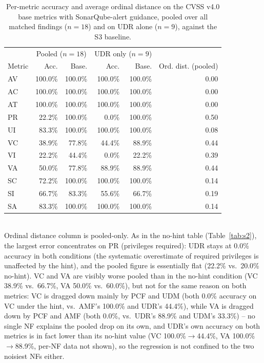 \begin{table}[t]
\centering
\caption{Per-metric accuracy and average ordinal distance on the CVSS v4.0 base metrics with SonarQube-alert guidance, pooled over all matched findings ($n=18$) and on UDR alone ($n=9$), against the S3 baseline.}
\label{tab:s2-hint}
\begin{tabular}{lrrrrr}
\toprule
& \multicolumn{2}{c}{Pooled ($n=18$)} & \multicolumn{2}{c}{UDR only ($n=9$)} & \\
Metric & Acc. & Base. & Acc. & Base. & Ord. dist. (pooled) \\
\midrule
AV & 100.0\% & 100.0\% & 100.0\% & 100.0\% & 0.00 \\
AC & 100.0\% & 100.0\% & 100.0\% & 100.0\% & 0.00 \\
AT & 100.0\% & 100.0\% & 100.0\% & 100.0\% & 0.00 \\
PR & 22.2\%  & 100.0\% & 0.0\%   & 100.0\% & 0.50 \\
UI & 83.3\%  & 100.0\% & 100.0\% & 100.0\% & 0.08 \\
VC & 38.9\%  & 77.8\%  & 44.4\%  & 88.9\%  & 0.44 \\
VI & 22.2\%  & 44.4\%  & 0.0\%   & 22.2\%  & 0.39 \\
VA & 50.0\%  & 77.8\%  & 88.9\%  & 88.9\%  & 0.44 \\
SC & 72.2\%  & 100.0\% & 100.0\% & 100.0\% & 0.14 \\
SI & 66.7\%  & 83.3\%  & 55.6\%  & 66.7\%  & 0.19 \\
SA & 83.3\%  & 100.0\% & 100.0\% & 100.0\% & 0.14 \\
\bottomrule
\end{tabular}
\\[2pt]
\footnotesize{Ordinal distance column is pooled-only. As in the no-hint table (Table~\ref{tab:s2}), the largest error concentrates on PR (privileges required): UDR stays at 0.0\% accuracy in both conditions (the systematic overestimate of required privileges is unaffected by the hint), and the pooled figure is essentially flat (22.2\% vs.\ 20.0\% no-hint). VC and VA are visibly worse pooled than in the no-hint condition (VC 38.9\% vs.\ 66.7\%, VA 50.0\% vs.\ 60.0\%), but not for the same reason on both metrics: VC is dragged down mainly by PCF and UDM (both 0.0\% accuracy on VC under the hint, vs.\ AMF's 100.0\% and UDR's 44.4\%), while VA is dragged down by PCF and AMF (both 0.0\%, vs.\ UDR's 88.9\% and UDM's 33.3\%) -- no single NF explains the pooled drop on its own, and UDR's own accuracy on both metrics is in fact lower than its no-hint value (VC 100.0\%$\to$44.4\%, VA 100.0\%$\to$88.9\%, per-NF data not shown), so the regression is not confined to the two noisiest NFs either.}
\end{table}


